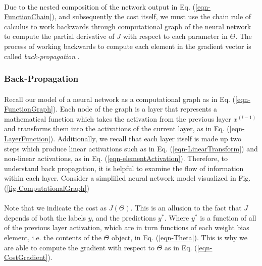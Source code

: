 \documentclass[12pt,letterpaper]{article}
\begin{document}
\paragraph*{}Due to the nested composition of the network output in Eq. (\ref{eqn-FunctionChain}), and subsequently the cost itself, we must use the chain rule of calculus to work backwards through computational graph of the neural network to compute the partial derivative of $J$ with respect to each parameter in $\Theta$. The process of working backwards to compute each element in the gradient vector is called \textit{back-propagation} \cite{Geron,Goodfellow,Loy}. 




\subsubsection{Back-Propagation}
\label{subsubsec-BackProp}

\paragraph*{}Recall our model of a neural network as a computational graph as in Eq. (\ref{eqn-FunctionGraph}). Each node of the graph is a layer that represents a mathematical function which takes the activation from the previous layer $x^{(l-1)}$ and transforms them into the activations of the current layer, as in Eq. (\ref{eqn-LayerFunction}). Additionally, we recall that each layer itself is made up two steps which produce linear activations such as in Eq. (\ref{eqn-LinearTransform}) and non-linear activations, as in Eq. (\ref{eqn-elementActivation}). Therefore, to understand back propagation, it is helpful to examine the flow of information within each layer. Consider a simplified neural network model visualized in Fig. (\ref{fig-ComputationalGraph})

\paragraph*{}Note that we indicate the cost as $J(\Theta)$. This is an allusion to the fact that $J$ depends of both the labels $y$, and the predictions $y^*$. Where $y^*$ is a function of all of the previous layer activation, which are in turn functions of each weight bias element, i.e. the contents of the $\Theta$ object, in Eq. (\ref{eqn-Theta}). This is why we are able to compute the gradient with respect to $\Theta$ as in Eq. (\ref{eqn-CostGradient}).
\end{document}
